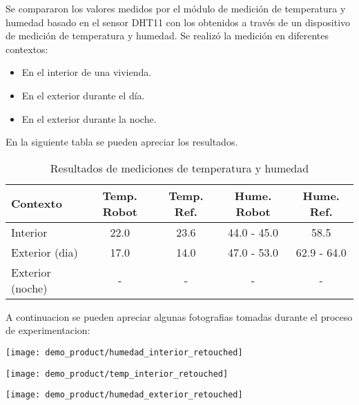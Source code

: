 Se compararon los valores medidos por el módulo de medición de temperatura y humedad basado en el sensor DHT11 con los obtenidos a través de un dispositivo de medición de temperatura y humedad. Se realizó la medición en diferentes contextos:

\begin{itemize}
	\item En el interior de una vivienda.
	\item En el exterior durante el día.
	\item En el exterior durante la noche.
\end{itemize}

En la siguiente tabla se pueden apreciar los resultados.

\begin{table}[h]
\centering
\caption[Resultados de mediciones de temperatura y humedad]{Resultados de mediciones de temperatura y humedad}
\begin{tabular}{l c c c c}
\toprule
\textbf{Contexto} & \textbf{Temp. Robot} & \textbf{Temp. Ref.} & \textbf{Hume. Robot}  & \textbf{Hume. Ref.}\\
\midrule
Interior & 22.0 & 23.6 & 44.0 - 45.0 & 58.5 \\
Exterior (dia) & 17.0  & 14.0 & 47.0 - 53.0 & 62.9 - 64.0 \\
Exterior (noche) & - & - & - & - \\
\bottomrule
\hline
\end{tabular}
\end{table}

A continuacion se pueden apreciar algunas fotografias tomadas durante el proceso de experimentacion:

\begin{center}
 \texttt{[image: demo\_product/humedad\_interior\_retouched]}
   \label{fig:humedad_interior}
\end{center}

\begin{center}
 \texttt{[image: demo\_product/temp\_interior\_retouched]}
   \label{fig:humedad_interior}
\end{center}


\begin{center}
 \texttt{[image: demo\_product/humedad\_exterior\_retouched]}
   \label{fig:humedad_interior}
\end{center}

